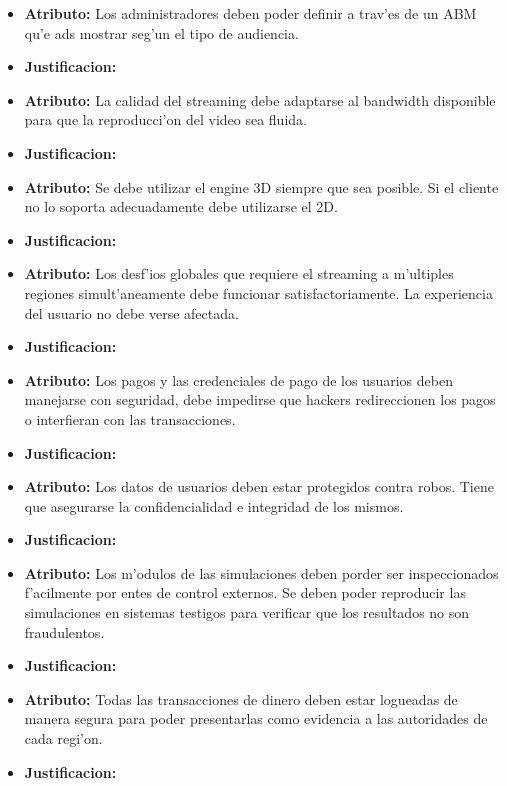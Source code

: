\begin{itemize}
\item \textbf{Atributo:} Los administradores deben poder definir a trav'es de un ABM qu'e ads mostrar seg'un el tipo de audiencia.
\item \textbf{Justificacion:}

\item \textbf{Atributo:} La calidad del streaming debe adaptarse al bandwidth disponible para que la reproducci'on del video sea fluida.
\item \textbf{Justificacion:}

\item \textbf{Atributo:} Se debe utilizar el engine 3D siempre que sea posible. Si el cliente no lo soporta adecuadamente debe utilizarse el 2D.
\item \textbf{Justificacion:}

\item \textbf{Atributo:} Los desf'ios globales que requiere el streaming a m'ultiples regiones simult'aneamente debe funcionar satisfactoriamente. La experiencia del usuario no debe verse afectada.
\item \textbf{Justificacion:}

\item \textbf{Atributo:} Los pagos y las credenciales de pago de los usuarios deben manejarse con seguridad, debe impedirse que hackers redireccionen los pagos o interfieran con las transacciones.
\item \textbf{Justificacion:}

\item \textbf{Atributo:} Los datos de usuarios deben estar protegidos contra robos. Tiene que asegurarse la confidencialidad e integridad de los mismos.
\item \textbf{Justificacion:}

\item \textbf{Atributo:} Los m'odulos de las simulaciones deben porder ser inspeccionados f'acilmente por entes de control externos. Se deben poder reproducir las simulaciones en sistemas testigos para verificar que los resultados no son fraudulentos.
\item \textbf{Justificacion:}

\item \textbf{Atributo:} Todas las transacciones de dinero deben estar logueadas de manera segura para poder presentarlas como evidencia a las autoridades de cada regi'on.
\item \textbf{Justificacion:}

\end{itemize}

